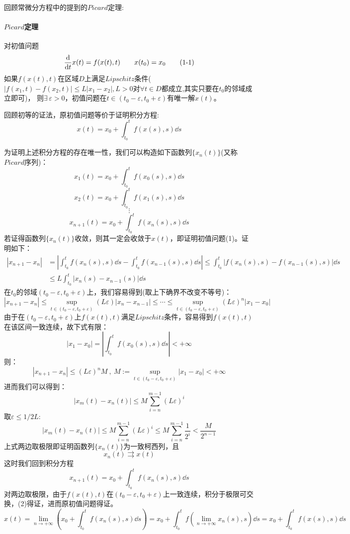 回顾常微分方程中的提到的$Picard$定理:

\paragraph*{$Picard$定理} \quad 对初值问题
\[\dv{}{t}x(t)=f(x(t),t) \qquad x(t_0)=x_0 \tag{1-1}\]
如果$f(x(t),t)$在区域$D$上满足$Lipschitz$条件($|f(x_1,t)-f(x_2,t)| \leq L|x_1-x_2|,L>0$对$\forall t \in D$都成立,其实只要在$t_0$的邻域成立即可)，
则$\exists \, \varepsilon > 0$，初值问题在$t \in (t_0-\varepsilon,t_0+\varepsilon)$有唯一解$x(t)$。

回顾初等的证法，原初值问题等价于证明积分方程:
\[x(t)=x_0+\int_{t_0}^tf(x(s),s)\dd s \tag{1-2}\]

为证明上述积分方程的存在唯一性，我们可以构造如下函数列$\{x_n(t)\}$(又称$Picard$序列)：
\[x_1(t)=x_0+\int_{t_0}^tf(x_0(s),s)\dd s\]
\[x_2(t)=x_0+\int_{t_0}^tf(x_1(s),s)\dd s\]
\[\vdots\]
\[x_{n+1}(t)=x_0+\int_{t_0}^tf(x_n(s),s)\dd s\]
若证得函数列$\{x_n(t)\}$收敛，则其一定会收敛于$x(t)$，即证明初值问题(1)。证明如下：
\begin{equation*}
    \begin{aligned}
        |x_{n+1}-x_n| & =\left|\int_{t_0}^tf(x_n(s),s)\dd s-\int_{t_0}^tf(x_{n-1}(s),s)\dd s\right| \leq \int_{t_0}^t \left| f(x_n(s),s)-f(x_{n-1}(s),s) \right| \dd s \\
        & \leq L\int_{t_0}^t \left| x_n(s)-x_{n-1}(s) \right| \dd s
    \end{aligned}
\end{equation*}
在$t_0$的邻域$(t_0-\varepsilon,t_0+\varepsilon)$上，我们容易得到(取上下确界不改变不等号)：
\[|x_{n+1}-x_n| \leq {\mathop {\text{sup}}\limits_{t \in (t_0-\varepsilon,t_0+\varepsilon)}} (L\varepsilon)|x_{n}-x_{n-1}| \leq \cdots \leq {\mathop {\text{sup}}\limits_{t \in (t_0-\varepsilon,t_0+\varepsilon)}} (L\varepsilon)^n|x_1-x_0|\]
由于在$(t_0-\varepsilon,t_0+\varepsilon)$上$f(x(t),t)$满足$Lipschitz$条件，容易得到$f(x(t),t)$在该区间一致连续，故下式有限：
\[|x_1-x_0|=|\int_{t_0}^tf(x_0(s),s)\dd s|<+\infty\]
则：
\[|x_{n+1}-x_n| \leq (L\varepsilon)^nM \ , \ M:={\mathop {\text{sup}}\limits_{t \in (t_0-\varepsilon,t_0+\varepsilon)}} |x_1-x_0| <+\infty\]
进而我们可以得到：
\[|x_m(t)-x_n(t)| \leq M\sum_{i=n}^{m-1}(L\varepsilon)^i\]
取$\varepsilon \leq 1/2L$:
\[|x_m(t)-x_n(t)| \leq M\sum_{i=n}^{m-1}(L\varepsilon)^i \leq M\sum_{i=n}^{m-1}\frac{1}{2^i} < \frac{M}{2^{n-1}}\]
上式两边取极限即证明函数列$\{x_n(t)\}$为一致柯西列，且
\[x_n(t) \rightrightarrows x(t)\]
这时我们回到积分方程
\[x_{n+1}(t)=x_0+\int_{t_0}^tf(x_n(s),s)\dd s\]
对两边取极限，由于$f(x(t),t)$在$(t_0-\varepsilon,t_0+\varepsilon)$上一致连续，积分于极限可交换，(2)得证，进而原初值问题得证。
\[x(t)=\lim_{n \rightarrow +\infty}\left(x_0+\int_{t_0}^tf(x_n(s),s)\dd s\right)=x_0+\int_{t_0}^tf \left (\lim_{n \rightarrow +\infty}x_n(s),s \right )\dd s=x_0+\int_{t_0}^tf(x(s),s)\dd s\]

